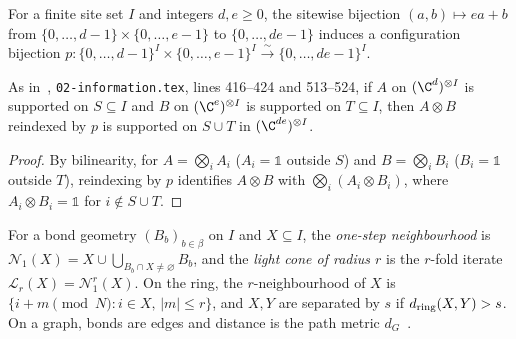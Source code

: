 \begin{definition}
    \label{def:qc_site_pair_coordinates}
    \leanok
    For a finite site set $I$ and integers $d,e\ge0$, the sitewise bijection $(a,b)\mapsto ea+b$ from $\{0,\dots,d-1\}\times\{0,\dots,e-1\}$ to $\{0,\dots,de-1\}$ induces a configuration bijection $p\colon\{0,\dots,d-1\}^I\times\{0,\dots,e-1\}^I\xrightarrow{\sim}\{0,\dots,de-1\}^I$.
\end{definition}

\begin{lemma}
    \label{thm:qc_site_pair_tensor_support}
    \leanok
    As in~\cite{OpenAI2026PolynomialPEPS}, \texttt{02-information.tex}, lines 416--424 and 513--524, if $A$ on $(\C^d)^{\otimes I}$ is supported on $S\subseteq I$ and $B$ on $(\C^e)^{\otimes I}$ is supported on $T\subseteq I$, then $A\otimes B$ reindexed by $p$ is supported on $S\cup T$ in $(\C^{de})^{\otimes I}$.
\end{lemma}
\begin{proof}\leanok
    By bilinearity, for $A=\bigotimes_i A_i$ ($A_i=\mathbb 1$ outside $S$) and $B=\bigotimes_i B_i$ ($B_i=\mathbb 1$ outside $T$), reindexing by $p$ identifies $A\otimes B$ with $\bigotimes_i(A_i\otimes B_i)$, where $A_i\otimes B_i=\mathbb 1$ for $i\notin S\cup T$.
\end{proof}

\begin{definition}
    \label{def:qc_light_cone_geometry}
    \leanok
    For a bond geometry $(B_b)_{b\in\beta}$ on $I$ and $X\subseteq I$, the \emph{one-step neighbourhood} is $\mathcal N_1(X)=X\cup\bigcup_{B_b\cap X\ne\varnothing}B_b$, and the \emph{light cone of radius $r$} is the $r$-fold iterate $\mathcal L_r(X)=\mathcal N_1^r(X)$. On the ring, the $r$-neighbourhood of $X$ is $\{i+m\pmod N:i\in X,\,|m|\le r\}$, and $X,Y$ are separated by $s$ if $d_{\rm ring}(X,Y)>s$. On a graph, bonds are edges and distance is the path metric $d_G$~\cite{Piroli2021LOCC}.
\end{definition}

